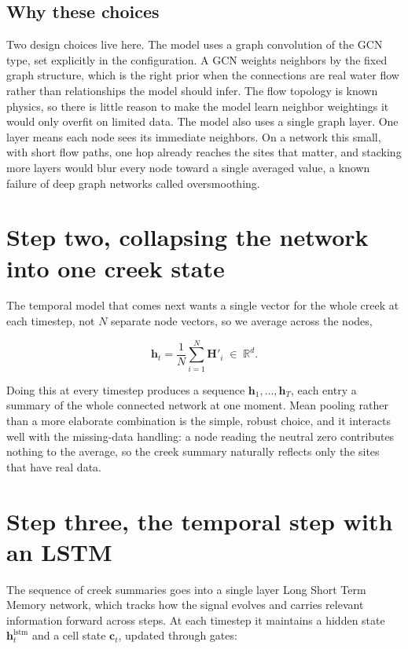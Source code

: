 \documentclass[11pt]{article}
\begin{document}
\subsection*{Why these choices}

Two design choices live here. The model uses a graph convolution of the GCN type, set explicitly in the configuration. A GCN weights neighbors by the fixed graph structure, which is the right prior when the connections are real water flow rather than relationships the model should infer. The flow topology is known physics, so there is little reason to make the model learn neighbor weightings it would only overfit on limited data. The model also uses a single graph layer. One layer means each node sees its immediate neighbors. On a network this small, with short flow paths, one hop already reaches the sites that matter, and stacking more layers would blur every node toward a single averaged value, a known failure of deep graph networks called oversmoothing.

\section*{Step two, collapsing the network into one creek state}

The temporal model that comes next wants a single vector for the whole creek at each timestep, not $N$ separate node vectors, so we average across the nodes,

\[
\mathbf{h}_t = \frac{1}{N} \sum_{i=1}^{N} \mathbf{H}'_i \;\in\; \mathbb{R}^{d}.
\]

Doing this at every timestep produces a sequence $\mathbf{h}_1, \dots, \mathbf{h}_T$, each entry a summary of the whole connected network at one moment. Mean pooling rather than a more elaborate combination is the simple, robust choice, and it interacts well with the missing-data handling: a node reading the neutral zero contributes nothing to the average, so the creek summary naturally reflects only the sites that have real data.

\section*{Step three, the temporal step with an LSTM}

The sequence of creek summaries goes into a single layer Long Short Term Memory network, which tracks how the signal evolves and carries relevant information forward across steps. At each timestep it maintains a hidden state $\mathbf{h}_t^{\text{lstm}}$ and a cell state $\mathbf{c}_t$, updated through gates:
\end{document}
